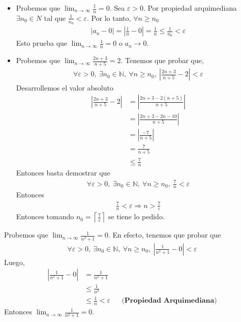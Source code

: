 \documentclass[12pt]{book}
\begin{document}
\begin{eje}{}{}
    \begin{itemize}
        \item Probemos que $\displaystyle \lim_{n \to \infty} \frac{1}{n}=0$. Sea $\varepsilon >0$. Por propiedad arquimediana $\exists n_0 \in N$ tal que $\displaystyle \frac{1}{n_0} < \varepsilon$. Por lo tanto, $\forall n \geq n_0$
    \begin{align*}
        |a_n-0|=\left|\frac{1}{n}-0 \right|= \frac{1}{n}\leq\frac{1}{n_0}<\varepsilon
    \end{align*}
    Esto prueba que $\displaystyle \lim_{n \to \infty} \frac{1}{n}=0$ o $a_n \to 0$.

    \item Probemos que $\displaystyle \lim_{n \to \infty} \frac{2n+3}{n+5}=2$. Tenemos que probar que,
    \begin{align*}
        \forall \varepsilon>0, \ \exists n_0 \in \mathbb{N}, \ \forall n\geq n_0 , \ \left| \frac{2n+3}{n+5}- 2\right| < \varepsilon 
    \end{align*}
    Desarrollemos el valor absoluto
    \begin{align*}
         \left| \frac{2n+3}{n+5}- 2\right|&=  \left| \frac{2n+3-2(n+5)}{n+5}\right| \\
         &= \left| \frac{2n+3-2n-10}{n+5}\right| \\
         &= \left| \frac{-7}{n+5}\right| \\\
         &=\frac{7}{n+5} \\
         &\leq \frac{7}{n}
    \end{align*}
    Entonces basta demostrar que 
    \begin{align*}
        \forall \varepsilon>0, \ \exists n_0 \in \mathbb{N}, \ \forall n\geq n_0 , \ \frac{7}{n} < \varepsilon 
    \end{align*}
    Entonces
    \begin{align*}
        \frac{7}{n}< \varepsilon \Longrightarrow n>\frac{7}{\varepsilon}
    \end{align*}
    Entonces tomando $n_0 =\displaystyle \left\lceil \frac{7}{\varepsilon}\right \rceil $ se tiene lo pedido.
    \end{itemize}
\end{eje}

\begin{eje}{}{}
    Probemos que $\displaystyle \lim_{n \to \infty} \frac{1}{n^2+1}=0$. En efecto, tenemos que probar que 
     \begin{align*}
        \forall \varepsilon>0, \ \exists n_0 \in \mathbb{N}, \ \forall n\geq n_0 , \ \left| \frac{1}{n^2+1}- 0\right| < \varepsilon 
    \end{align*}
    Luego,
    \begin{align*}
         \left| \frac{1}{n^2+1}- 0\right|&= \frac{1}{n^2+1} \\
         &\leq \frac{1}{n^2} \\
         &\leq \frac{1}{n} < \varepsilon && \textbf{(Propiedad Arquimediana)}
    \end{align*}
    Entonces $\displaystyle \lim_{n \to \infty} \frac{1}{n^2+1}=0$.
\end{eje}
\end{document}
